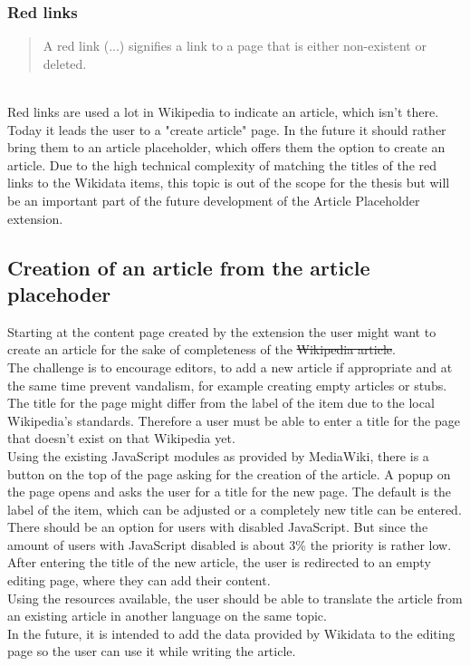 \documentclass[11pt]{article}
\begin{document}
  \subsubsection{Red links}
  \begin{quotation}
  A red link (...) signifies a link to a page that is either non-existent or deleted. 
  \end{quotation} \cite{wiki:01} %
  \\
  Red links are used a lot in Wikipedia to indicate an article, which isn't there. Today it leads the user to a "create article" page. In the future it should rather bring them to an article placeholder, which offers them the option to create an article. Due to the high technical complexity of matching the titles of the red links to the Wikidata items, this topic is out of the scope for the thesis but will be an important part of the future development of the Article Placeholder extension.

  \subsection{Creation of an article from the article placehoder}
  Starting at the content page created by the extension the user might want to create an article for the sake of completeness of the \st{Wikipedia article}. \\
  The challenge is to encourage editors, to add a new article if appropriate and at the same time prevent vandalism, for example creating empty articles or stubs.\\ 
  The title for the page might differ from the label of the item due to the local Wikipedia's standards. Therefore a user must be able to enter a title for the page that doesn't exist on that Wikipedia yet. \\
  Using the existing JavaScript modules as provided by MediaWiki, there is a button on the top of the page asking for the creation of the article. A popup on the page opens and asks the user for a title for the new page. The default is the label of the item, which can be adjusted or a completely new title can be entered. \\
  There should be an option for users with disabled JavaScript. But since the amount of users with JavaScript disabled is about 3\% %
  the priority is rather low. \\
  After entering the title of the new article, the user is redirected to an empty editing page, where they can add their content. \\
  Using the resources available, the user should be able to translate the article from an existing article in another language on the same topic. \\
  In the future, it is intended to add the data provided by Wikidata to the editing page so the user can use it while writing the article. 
\end{document}
